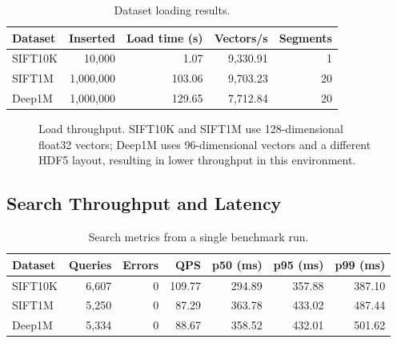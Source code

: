 \documentclass[11pt,a4paper]{article}
\begin{document}
\begin{table}[H]
\centering
\caption{Dataset loading results.}
\renewcommand{\arraystretch}{1.2}
\begin{tabular}{lrrrr}
\toprule
\textbf{Dataset} & \textbf{Inserted} & \textbf{Load time (s)} &
\textbf{Vectors/s} & \textbf{Segments} \\
\midrule
SIFT10K & 10,000    & 1.07   & 9{,}330.91 & 1  \\
SIFT1M  & 1,000,000 & 103.06 & 9{,}703.23 & 20 \\
Deep1M  & 1,000,000 & 129.65 & 7{,}712.84 & 20 \\
\bottomrule
\end{tabular}
\end{table}

\begin{figure}[H]
\centering
{}
\caption{Load throughput. SIFT10K and SIFT1M use 128-dimensional float32
vectors; Deep1M uses 96-dimensional vectors and a different HDF5 layout,
resulting in lower throughput in this environment.}
\end{figure}

\subsection{Search Throughput and Latency}

\begin{table}[H]
\centering
\caption{Search metrics from a single benchmark run.}
\renewcommand{\arraystretch}{1.2}
\begin{tabular}{lrrrrrr}
\toprule
\textbf{Dataset} & \textbf{Queries} & \textbf{Errors} & \textbf{QPS} &
\textbf{p50 (ms)} & \textbf{p95 (ms)} & \textbf{p99 (ms)} \\
\midrule
SIFT10K & 6{,}607 & 0 & 109.77 & 294.89 & 357.88 & 387.10 \\
SIFT1M  & 5{,}250 & 0 & 87.29  & 363.78 & 433.02 & 487.44 \\
Deep1M  & 5{,}334 & 0 & 88.67  & 358.52 & 432.01 & 501.62 \\
\bottomrule
\end{tabular}
\end{table}
\end{document}
